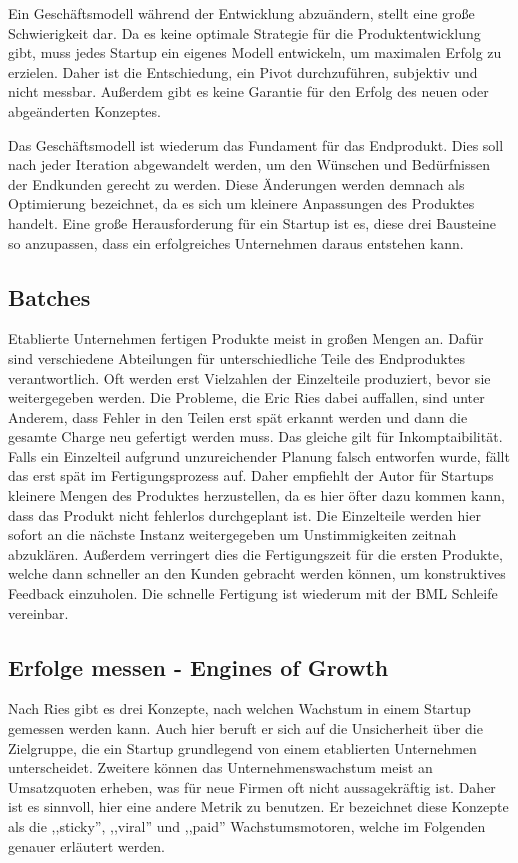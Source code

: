 Ein Geschäftsmodell während der Entwicklung abzuändern, stellt eine große Schwierigkeit dar. Da es keine optimale Strategie für die Produktentwicklung gibt, muss jedes Startup ein eigenes Modell entwickeln, um maximalen Erfolg zu erzielen. Daher ist die Entschiedung, ein Pivot durchzuführen, subjektiv und nicht messbar. Außerdem gibt es keine Garantie für den Erfolg des neuen oder abgeänderten Konzeptes. 

Das Geschäftsmodell ist wiederum das Fundament für das Endprodukt. Dies soll nach jeder Iteration abgewandelt werden, um den Wünschen und Bedürfnissen der Endkunden gerecht zu werden. Diese Änderungen werden demnach als Optimierung bezeichnet, da es sich um kleinere Anpassungen des Produktes handelt. Eine große Herausforderung für ein Startup ist es, diese drei Bausteine so anzupassen, dass ein erfolgreiches Unternehmen daraus entstehen kann.

\subsection*{\label{sec:LeanStartup-Batches}\thesubsection\quad Batches}
Etablierte Unternehmen fertigen Produkte meist in großen Mengen an. Dafür sind verschiedene Abteilungen für unterschiedliche Teile des Endproduktes verantwortlich. Oft werden erst Vielzahlen der Einzelteile produziert, bevor sie weitergegeben werden. Die Probleme, die Eric Ries dabei auffallen, sind unter Anderem, dass Fehler in den Teilen erst spät erkannt werden und dann die gesamte Charge neu gefertigt werden muss. Das gleiche gilt für Inkomptaibilität. Falls ein Einzelteil aufgrund unzureichender Planung falsch entworfen wurde, fällt das erst spät im Fertigungsprozess auf. Daher empfiehlt der Autor für Startups kleinere Mengen des Produktes herzustellen, da es hier öfter dazu kommen kann, dass das Produkt nicht fehlerlos durchgeplant ist. Die Einzelteile werden hier sofort an die nächste Instanz weitergegeben um Unstimmigkeiten zeitnah abzuklären. Außerdem verringert dies die Fertigungszeit für die ersten Produkte, welche dann schneller an den Kunden gebracht werden können, um konstruktives Feedback einzuholen. Die schnelle Fertigung ist wiederum mit der \ac{BML} Schleife vereinbar.

\subsection*{\label{sec:LeanStartup-EnginesOfGrowth}\thesubsection\quad Erfolge messen - Engines of Growth}
Nach Ries gibt es drei Konzepte, nach welchen Wachstum in einem Startup gemessen werden kann. Auch hier beruft er sich auf die Unsicherheit über die Zielgruppe, die ein Startup grundlegend von einem etablierten Unternehmen unterscheidet. Zweitere können das Unternehmenswachstum meist an Umsatzquoten erheben, was für neue Firmen oft nicht aussagekräftig ist. Daher ist es sinnvoll, hier eine andere Metrik zu benutzen. Er bezeichnet diese Konzepte als die ,,sticky'', ,,viral'' und ,,paid'' Wachstumsmotoren, welche im Folgenden genauer erläutert werden.

